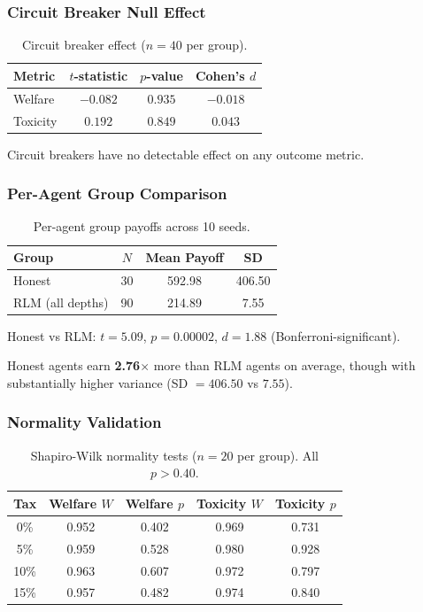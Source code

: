 \documentclass[11pt]{article}
\begin{document}
\subsubsection{Circuit Breaker Null Effect}

\begin{table}[H]
\centering
\caption{Circuit breaker effect ($n = 40$ per group).}
\label{tab:cb}
\small
\begin{tabular}{@{}lccc@{}}
\toprule
Metric & $t$-statistic & $p$-value & Cohen's $d$ \\
\midrule
Welfare & $-0.082$ & $0.935$ & $-0.018$ \\
Toxicity & $0.192$ & $0.849$ & $0.043$ \\
\bottomrule
\end{tabular}
\end{table}

Circuit breakers have no detectable effect on any outcome metric.

\subsubsection{Per-Agent Group Comparison}

\begin{table}[H]
\centering
\caption{Per-agent group payoffs across 10 seeds.}
\label{tab:agents-results}
\small
\begin{tabular}{@{}lccc@{}}
\toprule
Group & $N$ & Mean Payoff & SD \\
\midrule
Honest & 30 & 592.98 & 406.50 \\
RLM (all depths) & 90 & 214.89 & 7.55 \\
\bottomrule
\end{tabular}

\vspace{4pt}
\footnotesize Honest vs RLM: $t = 5.09$, $p = 0.00002$, $d = 1.88$ (Bonferroni-significant).
\end{table}

Honest agents earn \textbf{2.76$\times$} more than RLM agents on average, though with substantially higher variance (SD $= 406.50$ vs $7.55$).

\subsubsection{Normality Validation}

\begin{table}[H]
\centering
\caption{Shapiro-Wilk normality tests ($n = 20$ per group). All $p > 0.40$.}
\label{tab:normality}
\small
\begin{tabular}{@{}ccccc@{}}
\toprule
Tax & Welfare $W$ & Welfare $p$ & Toxicity $W$ & Toxicity $p$ \\
\midrule
0\% & 0.952 & 0.402 & 0.969 & 0.731 \\
5\% & 0.959 & 0.528 & 0.980 & 0.928 \\
10\% & 0.963 & 0.607 & 0.972 & 0.797 \\
15\% & 0.957 & 0.482 & 0.974 & 0.840 \\
\bottomrule
\end{tabular}
\end{table}
\end{document}
